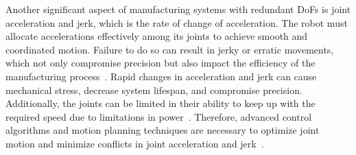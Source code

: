 









Another significant aspect of manufacturing systems with redundant \acrshort{DoF}s is joint acceleration and jerk, which is the rate of change of acceleration. The robot must allocate accelerations effectively among its joints to achieve smooth and coordinated motion. Failure to do so can result in jerky or erratic movements, which not only compromise precision but also impact the efficiency of the manufacturing process~\cite{Duong.2021}. Rapid changes in acceleration and jerk can cause mechanical stress, decrease system lifespan, and compromise precision. Additionally, the joints can be limited in their ability to keep up with the required speed due to limitations in power~\cite{Staff.1988}. Therefore, advanced control algorithms and motion planning techniques are necessary to optimize joint motion and minimize conflicts in joint acceleration and jerk~\cite{Duong.2021, Valente.2017}.

